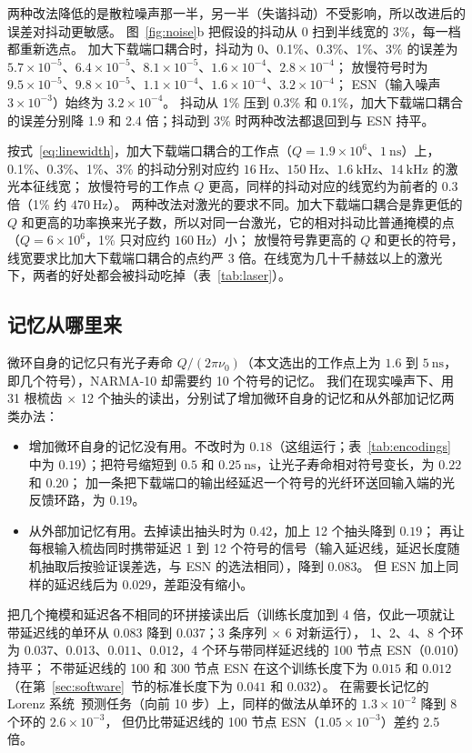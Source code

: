 两种改法降低的是散粒噪声那一半，另一半（失谐抖动）不受影响，所以改进后的误差对抖动更敏感。
图~\ref{fig:noise}b 把假设的抖动从 0 扫到半线宽的 3\%，每一档都重新选点。
加大下载端口耦合时，抖动为 0、0.1\%、0.3\%、1\%、3\% 的误差为
$5.7\times10^{-5}$、$6.4\times10^{-5}$、$8.1\times10^{-5}$、$1.6\times10^{-4}$、$2.8\times10^{-4}$；
放慢符号时为 $9.5\times10^{-5}$、$9.8\times10^{-5}$、$1.1\times10^{-4}$、$1.6\times10^{-4}$、$3.2\times10^{-4}$；
ESN（输入噪声 $3\times10^{-3}$）始终为 $3.2\times10^{-4}$。
抖动从 1\% 压到 0.3\% 和 0.1\%，加大下载端口耦合的误差分别降 1.9 和 2.4 倍；抖动到 3\% 时两种改法都退回到与 ESN 持平。

按式~\eqref{eq:linewidth}，加大下载端口耦合的工作点（$Q=1.9\times10^{6}$、$1~\mathrm{ns}$）上，0.1\%、0.3\%、1\%、3\% 的抖动分别对应约
$16~\mathrm{Hz}$、$150~\mathrm{Hz}$、$1.6~\mathrm{kHz}$、$14~\mathrm{kHz}$ 的激光本征线宽；
放慢符号的工作点 $Q$ 更高，同样的抖动对应的线宽约为前者的 0.3 倍（1\% 约 $470~\mathrm{Hz}$）。
两种改法对激光的要求不同。加大下载端口耦合是靠更低的 $Q$ 和更高的功率换来光子数，所以对同一台激光，它的相对抖动比普通掩模的点（$Q=6\times10^{6}$，1\% 只对应约 $160~\mathrm{Hz}$）小；
放慢符号靠更高的 $Q$ 和更长的符号，线宽要求比加大下载端口耦合的点约严 3 倍。在线宽为几十千赫兹以上的激光下，两者的好处都会被抖动吃掉（表~\ref{tab:laser}）。

\subsection{记忆从哪里来}\label{sec:memory}

微环自身的记忆只有光子寿命 $Q/(2\pi\nu_0)$（本文选出的工作点上为 $1.6$ 到 $5~\mathrm{ns}$，即几个符号），NARMA-10 却需要约 10 个符号的记忆。
我们在现实噪声下、用 31 根梳齿 $\times$ 12 个抽头的读出，分别试了增加微环自身的记忆和从外部加记忆两类办法：
\begin{itemize}
\item 增加微环自身的记忆没有用。不改时为 $0.18$（这组运行；表~\ref{tab:encodings} 中为 $0.19$）；把符号缩短到 $0.5$ 和 $0.25~\mathrm{ns}$，让光子寿命相对符号变长，为 $0.22$ 和 $0.20$；
      加一条把下载端口的输出经延迟一个符号的光纤环送回输入端的光反馈环路，为 $0.19$。
\item 从外部加记忆有用。去掉读出抽头时为 $0.42$，加上 12 个抽头降到 $0.19$；
      再让每根输入梳齿同时携带延迟 1 到 12 个符号的信号（输入延迟线，延迟长度随机抽取后按验证误差选，与 ESN 的选法相同），降到 $0.083$。
      但 ESN 加上同样的延迟线后为 $0.029$，差距没有缩小。
\end{itemize}
把几个掩模和延迟各不相同的环拼接读出后（训练长度加到 4 倍，仅此一项就让带延迟线的单环从 $0.083$ 降到 $0.037$；3 条序列 $\times$ 6 对新运行），
1、2、4、8 个环为 $0.037$、$0.013$、$0.011$、$0.012$，4 个环与带同样延迟线的 100 节点 ESN（$0.010$）持平；
不带延迟线的 100 和 300 节点 ESN 在这个训练长度下为 $0.015$ 和 $0.012$（在第~\ref{sec:software}~节的标准长度下为 $0.041$ 和 $0.032$）。
在需要长记忆的 Lorenz 系统~\cite{lorenz1963}预测任务（向前 10 步）上，同样的做法从单环的 $1.3\times10^{-2}$ 降到 8 个环的 $2.6\times10^{-3}$，
但仍比带延迟线的 100 节点 ESN（$1.05\times10^{-3}$）差约 2.5 倍。

